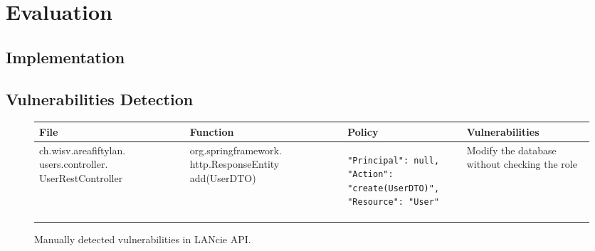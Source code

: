 \section{Evaluation}%





\subsection{Implementation}

\subsection{Vulnerabilities Detection}

\onecolumn
\begin{sidewaysfigure}[p]
  \caption{Manually detected vulnerabilities in LANcie API.}
  \label{tab:api}
  \centering
  \begin{tabular}{ |p{} | p{} | p{} | p{}|}
    \hline
    File                                                       & Function & Policy & Vulnerabilities \\
    \hline
    ch.wisv.areafiftylan. users.controller. UserRestController &
    org.springframework. http.ResponseEntity add(UserDTO)      &
    \begin{lstlisting}
"Principal": null,
"Action": "create(UserDTO)",
"Resource": "User"
    \end{lstlisting}                                     &
    Modify the database without checking the role                                                    \\
    \hline
  \end{tabular}
\end{sidewaysfigure}
\twocolumn
